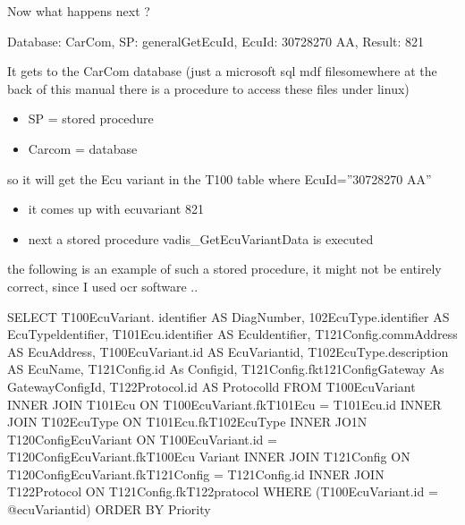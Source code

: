 \documentclass[letterpaper,10pt,english]{sphinxmanual}
\begin{document}
\sphinxAtStartPar
Now what happens next ?

\begin{sphinxVerbatim}[commandchars=\\\{\}]
[CarComRepository][010][Event] Database: CarCom, SP: general\PYGZus{}GetEcuId,
EcuId: 30728270 AA, Result: 821
\end{sphinxVerbatim}

\sphinxAtStartPar
It gets to the CarCom database (just a microsoft sql mdf file\sphinxhyphen{}somewhere at the back of this manual there is a procedure to access these files under linux)

\sphinxAtStartPar
{}
\begin{itemize}
\item {} 
\sphinxAtStartPar
SP = stored procedure

\item {} 
\sphinxAtStartPar
Carcom = database

\end{itemize}

\sphinxAtStartPar
{}

\sphinxAtStartPar
so it will get the Ecu variant in the T100 table where EcuId=”30728270 AA”
\begin{itemize}
\item {} 
\sphinxAtStartPar
it comes up with ecuvariant 821

\item {} 
\sphinxAtStartPar
next a stored procedure vadis\_GetEcuVariantData is executed

\end{itemize}

\sphinxAtStartPar
the following is an example of such a stored procedure, it might not be entirely correct, since I used ocr software ..

\begin{sphinxVerbatim}[commandchars=\\\{\}]
SELECT
T100\PYGZus{}EcuVariant. identifier AS DiagNumber,
102\PYGZus{}EcuType.identifier AS EcuTypeldentifier,
T101\PYGZus{}Ecu.identifier AS Eculdentifier,
T121\PYGZus{}Config.commAddress AS EcuAddress,
T100\PYGZus{}EcuVariant.id AS EcuVariantid,
T102\PYGZus{}EcuType.description AS EcuName,
T121\PYGZus{}Config.id As Configid,
T121\PYGZus{}Config.fkt121\PYGZus{}Config\PYGZus{}Gateway As GatewayConfigId,
T122\PYGZus{}Protocol.id AS Protocolld
FROM
T100\PYGZus{}EcuVariant
INNER JOIN
T101\PYGZus{}Ecu ON T100\PYGZus{}EcuVariant.fkT101\PYGZus{}Ecu = T101\PYGZus{}Ecu.id
INNER JOIN
T102\PYGZus{}EcuType ON T101\PYGZus{}Ecu.fkT102\PYGZus{}EcuType
INNER JO1N
T120\PYGZus{}Config\PYGZus{}EcuVariant ON T100\PYGZus{}EcuVariant.id = T120\PYGZus{}Config\PYGZus{}EcuVariant.fkT100\PYGZus{}Ecu
Variant
INNER JOIN
T121\PYGZus{}Config ON T120\PYGZus{}Config\PYGZus{}EcuVariant.fkT121\PYGZus{}Config = T121\PYGZus{}Config.id
INNER JOIN
T122\PYGZus{}Protocol ON T121\PYGZus{}Config.fkT122\PYGZus{}pratocol
WHERE (T100\PYGZus{}EcuVariant.id = @ecuVariantid)
ORDER BY Priority
\end{sphinxVerbatim}
\end{document}
